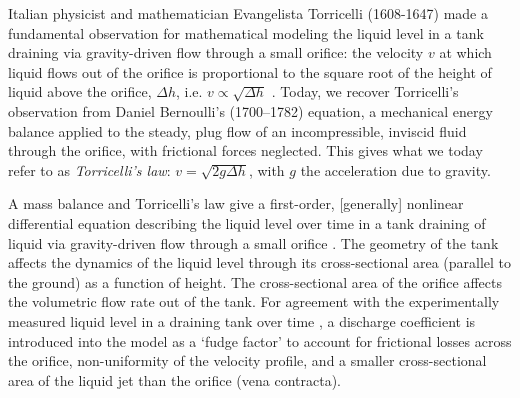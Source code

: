 \documentclass[openacc]{rsproca_new}%
\begin{document}


Italian physicist and mathematician Evangelista Torricelli (1608-1647) made a fundamental observation for mathematical modeling the liquid level in a tank draining via gravity-driven flow through a small orifice: the velocity $v$ at which liquid flows out of the orifice is proportional to the square root of the height of liquid above the orifice, $\Delta h$, i.e. $v\propto \sqrt{\Delta h}$ \cite{mills1982newton}. Today, we recover Torricelli's observation from Daniel Bernoulli's (1700–1782) equation, a mechanical energy balance applied to the steady, plug flow of an incompressible, inviscid fluid through the orifice, with frictional forces neglected. This gives what we today refer to as \emph{Torricelli's law}: $v=\sqrt{2 g \Delta h}$, with $g$ the acceleration due to gravity. \cite{d2021torricelli}

A mass balance and Torricelli's law give a first-order, [generally] nonlinear differential equation describing the liquid level over time in a tank draining of liquid via gravity-driven flow through a small orifice \cite{groetsch1993inverse,seborg2016process}.
The geometry of the tank affects the dynamics of the liquid level through its cross-sectional area (parallel to the ground) as a function of height.
The cross-sectional area of the orifice affects the volumetric flow rate out of the tank.
For agreement with the experimentally measured liquid level in a draining tank over time \cite{de2000pin,blasone2015discharge,wadhwa2021study,liu2008drainage}, a discharge coefficient is introduced into the model as a `fudge factor' to
account for frictional losses across the orifice, non-uniformity of the velocity profile, and a smaller cross-sectional area of the liquid jet than the orifice (vena contracta).
\cite{teoman2022discharge,hicks2014determining,blasone2015discharge}
\end{document}
